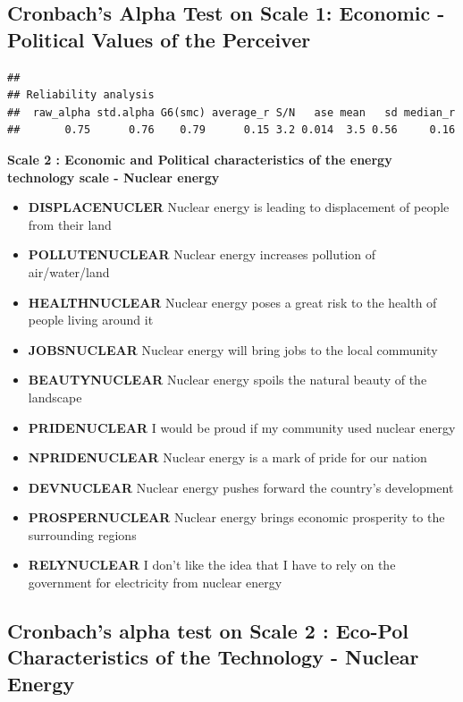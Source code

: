 \documentclass[
]{article}
\providecommand{\tightlist}{%
  \setlength{\itemsep}{0pt}\setlength{\parskip}{0pt}}
\begin{document}
\hypertarget{cronbachs-alpha-test-on-scale-1-economic--political-values-of-the-perceiver}{%
\subsection{Cronbach's Alpha Test on Scale 1: Economic -Political Values
of the
Perceiver}\label{cronbachs-alpha-test-on-scale-1-economic--political-values-of-the-perceiver}}

\begin{verbatim}
## 
## Reliability analysis   
##  raw_alpha std.alpha G6(smc) average_r S/N   ase mean   sd median_r
##       0.75      0.76    0.79      0.15 3.2 0.014  3.5 0.56     0.16
\end{verbatim}

\newpage

\textbf{Scale 2 : Economic and Political characteristics of the energy
technology scale - Nuclear energy}

\begin{itemize}
\tightlist
\item
  \textbf{DISPLACENUCLER} Nuclear energy is leading to displacement of
  people from their land
\item
  \textbf{POLLUTENUCLEAR} Nuclear energy increases pollution of
  air/water/land
\item
  \textbf{HEALTHNUCLEAR} Nuclear energy poses a great risk to the health
  of people living around it
\item
  \textbf{JOBSNUCLEAR} Nuclear energy will bring jobs to the local
  community
\item
  \textbf{BEAUTYNUCLEAR} Nuclear energy spoils the natural beauty of the
  landscape
\item
  \textbf{PRIDENUCLEAR} I would be proud if my community used nuclear
  energy
\item
  \textbf{NPRIDENUCLEAR} Nuclear energy is a mark of pride for our
  nation
\item
  \textbf{DEVNUCLEAR} Nuclear energy pushes forward the country's
  development
\item
  \textbf{PROSPERNUCLEAR} Nuclear energy brings economic prosperity to
  the surrounding regions
\item
  \textbf{RELYNUCLEAR} I don't like the idea that I have to rely on the
  government for electricity from nuclear energy
\end{itemize}

\hypertarget{cronbachs-alpha-test-on-scale-2-eco-pol-characteristics-of-the-technology---nuclear-energy}{%
\subsection{Cronbach's alpha test on Scale 2 : Eco-Pol Characteristics
of the Technology - Nuclear
Energy}\label{cronbachs-alpha-test-on-scale-2-eco-pol-characteristics-of-the-technology---nuclear-energy}}
\end{document}
